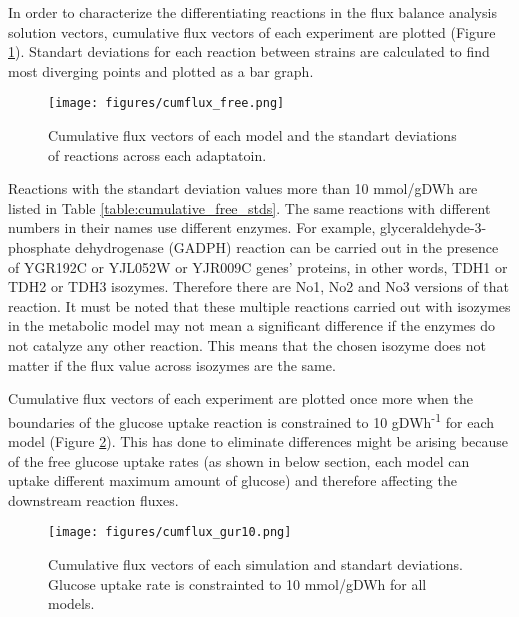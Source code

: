 In order to characterize the differentiating reactions in the flux balance analysis solution vectors, cumulative flux vectors of each experiment are plotted (Figure \ref{fig:cumflux_free}). Standart deviations for each reaction between strains are calculated to find most diverging points and plotted as a bar graph.

\begin{figure}[H]
\begin{center}
\texttt{[image: figures/cumflux\_free.png]}
\caption[Cumulative flux vectors of each simulation and standart deviations]{Cumulative flux vectors of each model and the standart deviations of reactions across each adaptatoin.}
\end{center}
\label{fig:cumflux_free}
\end{figure}

Reactions with the standart deviation values more than 10 mmol/gDWh are listed in Table \ref{table:cumulative_free_stds}. The same reactions with different numbers in their names use different enzymes. For example, glyceraldehyde-3-phosphate dehydrogenase (GADPH) reaction can be carried out in the presence of YGR192C or YJL052W or YJR009C genes' proteins, in other words, TDH1 or TDH2 or TDH3 isozymes. Therefore there are No1, No2 and No3 versions of that reaction. It must be noted that these multiple reactions carried out with isozymes in the metabolic model may not mean a significant difference if the enzymes do not catalyze any other reaction. This means that the chosen isozyme does not matter if the flux value across isozymes are the same.


Cumulative flux vectors of each experiment are plotted once more when the boundaries of the glucose uptake reaction is constrained to 10 gDWh\textsuperscript{-1} for each model (Figure \ref{fig:cumflux_gur10}). This has done to eliminate differences might be arising because of the free glucose uptake rates (as shown in below section, each model can uptake different maximum amount of glucose) and therefore affecting the downstream reaction fluxes.

\begin{figure}[H]
\begin{center}
\texttt{[image: figures/cumflux\_gur10.png]}
\caption[Cumulative flux vectors of each experiment when glucose uptake rate is constrained]{Cumulative flux vectors of each simulation and standart deviations. Glucose uptake rate is constrainted to  10 mmol/gDWh for all models. }
\end{center}
\label{fig:cumflux_gur10}
\end{figure}

